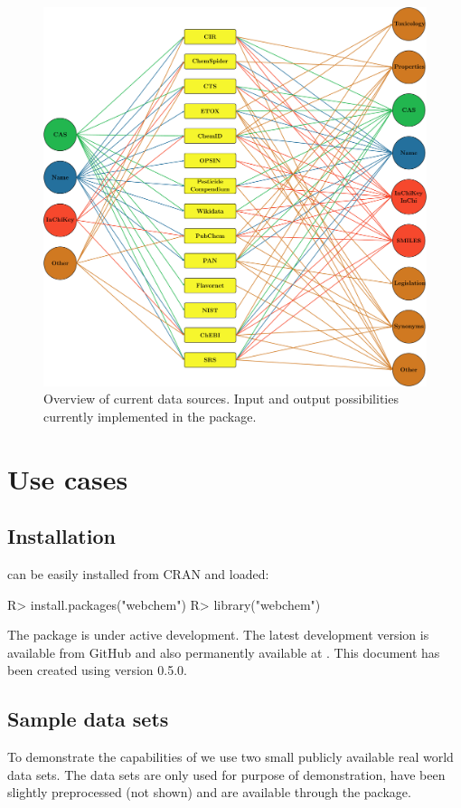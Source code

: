 \documentclass[article]{jss}
\begin{document}
\begin{figure}[t!]
  \centering
  \includegraphics{fig1}
  \caption{Overview of current data sources. Input and output possibilities currently implemented in the package.}
  \label{fig:fig1}
\end{figure}


\section[Use cases]{Use cases}
\subsection[Installation]{Installation}
 can be easily installed from CRAN and loaded:
%
\begin{CodeChunk}
\begin{CodeInput}
R> install.packages("webchem")
R> library("webchem")
\end{CodeInput}
\end{CodeChunk}
%
The package is under active development. The latest development
version is available from GitHub and also permanently available at \citet{zenodo}.  This document has been created using 
version 0.5.0.


\subsection[Sample data sets]{Sample data sets}
To demonstrate the capabilities of  we use two small
publicly available real world data sets.  The data sets are only used
for purpose of demonstration, have been slightly preprocessed (not
shown) and are available through the package.
\end{document}
